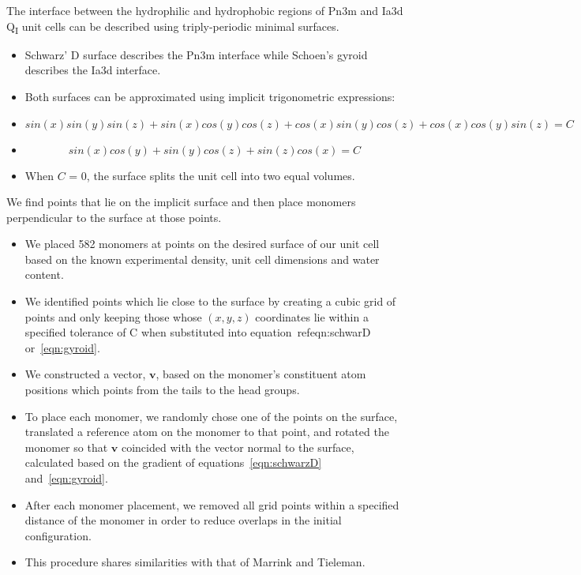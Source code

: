 \documentclass{article}
\begin{document}
  The interface between the hydrophilic and hydrophobic regions of Pn3m
  and Ia3d Q\textsubscript{I} unit cells can be described using triply-periodic
  minimal surfaces.~\cite{marrink_molecular_2001}  %
  \begin{itemize}
	\item Schwarz' D surface describes the Pn3m interface while Schoen's gyroid
	describes the Ia3d interface.~\cite{hyde_bicontinuous_1996, andersson_minimal_1988}
	\item Both surfaces can be approximated using implicit trigonometric expressions:~\cite{von_schnering_nodal_1991}
	\item \begin{equation} 
	          sin(x)sin(y)sin(z) + sin(x)cos(y)cos(z) + cos(x)sin(y)cos(z) + cos(x)cos(y)sin(z) = C 
	      \label{eqn:schwarzD}
	      \end{equation}
	\item \begin{equation} 
	          sin(x)cos(y) + sin(y)cos(z) + sin(z)cos(x) = C 
	      \label{eqn:gyroid}
	      \end{equation}
	\item When $C$ = 0, the surface splits the unit cell into two equal volumes. %
  \end{itemize}
  
  We find points that lie on the implicit surface and then place monomers
  perpendicular to the surface at those points.
  \begin{itemize}
    \item We placed 582 monomers at points on the desired surface of our unit
    cell based on the known experimental density, unit cell dimensions and 
    water content. %
    \item We identified points which lie close to the surface by creating a 
    cubic grid of points and only keeping those whose $(x, y, z)$ coordinates
    lie within a specified tolerance of C when substituted into 
    equation~ref{eqn:schwarD} or~\ref{eqn:gyroid}.
    \item We constructed a vector, $\mathbf{v}$, based on the monomer's constituent
    atom positions which points from the tails to the head groups.
    \item To place each monomer, we randomly chose one of the points on the surface, 
    translated a reference atom on the monomer to that point,
    and rotated the monomer so that $\mathbf{v}$ coincided with the vector normal
    to the surface, calculated based on the gradient of equations~\ref{eqn:schwarzD}
    and~\ref{eqn:gyroid}.
    \item After each monomer placement, we removed all grid points within a specified
    distance of the monomer in order to reduce overlaps in the initial configuration.
    \item This procedure shares similarities with that of Marrink and Tieleman.~\cite{marrink_molecular_2001} %
  \end{itemize}
  
\end{document}
